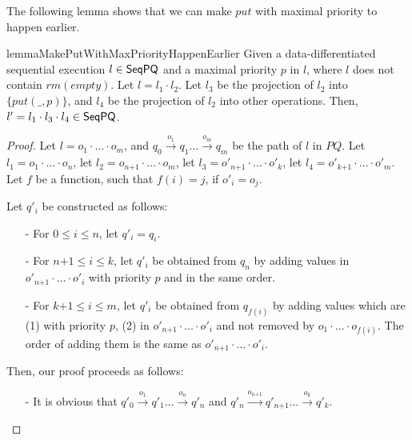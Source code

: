 The following lemma shows that we can make $\textit{put}$ with maximal priority to happen earlier.

\begin{restatable}{lemma}{MakePutWithMaxPriorityHappenEarlier}
\label{lemma:make put with maximal priority happen earlier}
Given a data-differentiated sequential execution $l \in \mathsf{SeqPQ}$ and a maximal priority $p$ in $l$, where $l$ does not contain $\textit{rm}(\textit{empty})$. Let $l=l_1 \cdot l_2$. Let $l_3$ be the projection of $l_2$ into $\{ \textit{put}(\_,p) \}$, and $l_4$ be the projection of $l_2$ into other operations. Then, $l'=l_1 \cdot l_3 \cdot l_4 \in \mathsf{SeqPQ}$.
\end{restatable}

\begin {proof}
Let $l=o_1 \cdot \ldots \cdot o_m$, and $q_0 \xrightarrow{o_1} q_1 \ldots \xrightarrow{o_m} q_m$ be the path of $l$ in $\textit{PQ}$. Let $l_1 = o_1 \cdot \ldots \cdot o_n$, let $l_2 = o_{\textit{n+1}} \cdot \ldots \cdot o_m$, let $l_3 = o'_{\textit{n+1}} \cdot \ldots \cdot o'_k$, let $l_4 = o'_{\textit{k+1}} \cdot \ldots \cdot o'_m$. Let $f$ be a function, such that $f(i)=j$, if $o'_i = o_j$.

Let $q'_i$ be constructed as follows:

\begin{itemize}
\setlength{\itemsep}{0.5pt}
\item[-] For $0 \leq i \leq n$, let $q'_i = q_i$.

\item[-] For $\textit{n+1} \leq i \leq k$, let $q'_i$ be obtained from $q_n$ by adding values in $o'_{\textit{n+1}} \cdot \ldots \cdot o'_i$ with priority $p$ and in the same order.

\item[-] For $\textit{k+1} \leq i \leq m$, let $q'_i$ be obtained from $q_{f(i)}$ by adding values which are (1) with priority $p$, (2) in $o'_{\textit{n+1}} \cdot \ldots \cdot o'_i$ and not removed by $o_1 \cdot \ldots \cdot o_{f(i)}$. The order of adding them is the same as $o'_{\textit{n+1}} \cdot \ldots \cdot o'_i$.
\end{itemize}

Then, our proof proceeds as follows:

\begin{itemize}
\setlength{\itemsep}{0.5pt}
\item[-] It is obvious that $q'_0 \xrightarrow{o_1} q'_1 \ldots \xrightarrow{o_n} q'_n$ and $q'_n \xrightarrow{o_{\textit{n+1}}} q'_{\textit{n+1}} \ldots \xrightarrow{o_k} q'_k$.


\end{itemize}
\end{proof}
